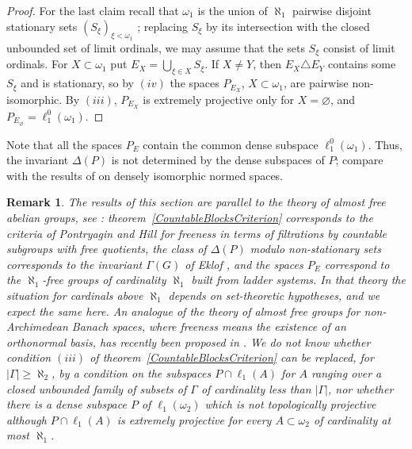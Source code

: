 \documentclass[12pt]{article}
\newtheorem{remark}[theorem]{Remark}
\newcommand{\lo}[1]{\ell_1^0(#1)}
\newcommand{\ellone}[1]{\ell_1(#1)}
\begin{document}
\begin{proof}
    For the last claim recall that $\omega_1$ is the union of $\aleph_1$
    pairwise disjoint stationary sets ${(S_\xi)}_{\xi<\omega_1}$
    \cite[theorem 8.10]{JechSetTheory}; replacing $S_\xi$ by its intersection
    with the closed unbounded set of limit ordinals, we may assume that the
    sets $S_\xi$ consist of limit ordinals. For $X\subset\omega_1$ put
    $E_X=\bigcup_{\xi\in X}S_\xi$. If $X\neq Y$, then $E_X\triangle E_Y$
    contains some $S_\xi$ and is stationary, so by $(iv)$ the spaces
    $P_{E_X}$, $X\subset\omega_1$, are pairwise non-isomorphic. By $(iii)$,
    $P_{E_X}$ is extremely projective only for $X=\varnothing$, and
    $P_{E_\varnothing}=\lo{\omega_1}$.
\end{proof}

Note that all the spaces $P_E$ contain the common dense subspace
$\lo{\omega_1}$. Thus, the invariant $\Delta(P)$ is not determined by the
dense subspaces of $P$; compare with the results of
\cite{HajekRussoDenselyIsom} on densely isomorphic normed spaces.

\begin{remark}\label{RemarkAlmostFree} The results of this section are parallel to the theory of
    almost free abelian groups, see \cite{EklofMeklerAlmostFree}:
    theorem~\ref{CountableBlocksCriterion} corresponds to the criteria of
    Pontryagin and Hill \cite{HillFreeness} for freeness in terms of
    filtrations by countable
    subgroups with free quotients, the class of $\Delta(P)$ modulo
    non-stationary sets corresponds to the invariant $\Gamma(G)$ of
    Eklof \cite{EklofKappaFree},
    and the spaces $P_E$ correspond to the $\aleph_1$-free groups of
    cardinality $\aleph_1$ built from ladder systems. In that theory the
    situation for cardinals above $\aleph_1$ depends on set-theoretic
    hypotheses, and we expect the same here. An analogue of the theory of
    almost free groups for non-Archimedean Banach spaces, where freeness
    means the existence of an orthonormal basis, has recently been
    proposed in \cite{MiharaAlmostFree}. We do not know whether
    condition $(iii)$ of theorem~\ref{CountableBlocksCriterion} can be
    replaced, for $|\Gamma|\geq\aleph_2$, by a condition on the subspaces
    $P\cap\ellone{A}$ for $A$ ranging over a closed unbounded family of
    subsets of $\Gamma$ of cardinality less than $|\Gamma|$, nor whether
    there is a dense subspace $P$ of $\ellone{\omega_2}$ which is not
    topologically projective although $P\cap\ellone{A}$ is extremely
    projective for every $A\subset\omega_2$ of cardinality at most $\aleph_1$.
\end{remark}
\end{document}
